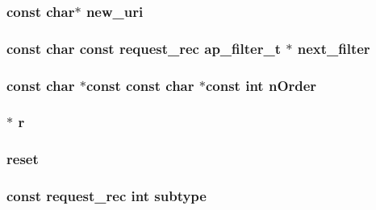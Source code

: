 \subsubsection[{\texorpdfstring{new\+\_\+uri}{new_uri}}]{\setlength{\rightskip}{0pt plus 5cm}const char$\ast$ new\+\_\+uri}\hypertarget{group__APACHE__CORE__REQ_ga65e3869c33c434213e1bc568332c0df9}{}\label{group__APACHE__CORE__REQ_ga65e3869c33c434213e1bc568332c0df9}
\subsubsection[{\texorpdfstring{next\+\_\+filter}{next_filter}}]{\setlength{\rightskip}{0pt plus 5cm}const char const {\bf request\+\_\+rec} {\bf ap\+\_\+filter\+\_\+t} $\ast$ next\+\_\+filter}\hypertarget{group__APACHE__CORE__REQ_ga9152b2a73566c0e87928a82d0e659c6c}{}\label{group__APACHE__CORE__REQ_ga9152b2a73566c0e87928a82d0e659c6c}
\subsubsection[{\texorpdfstring{n\+Order}{nOrder}}]{\setlength{\rightskip}{0pt plus 5cm}const char $\ast$const const char $\ast$const {\bf int} n\+Order}\hypertarget{group__APACHE__CORE__REQ_ga97a1daf1c1f7ee104df3d828c9d844db}{}\label{group__APACHE__CORE__REQ_ga97a1daf1c1f7ee104df3d828c9d844db}
\subsubsection[{\texorpdfstring{r}{r}}]{$\ast$ r}\hypertarget{group__APACHE__CORE__REQ_gac68e921ed15f71060d618adb662a84f6}{}\label{group__APACHE__CORE__REQ_gac68e921ed15f71060d618adb662a84f6}
\subsubsection[{\texorpdfstring{reset}{reset}}]{ reset}\hypertarget{group__APACHE__CORE__REQ_gadb7a760512715e86f925f8a8d4a15ba8}{}\label{group__APACHE__CORE__REQ_gadb7a760512715e86f925f8a8d4a15ba8}
\subsubsection[{\texorpdfstring{subtype}{subtype}}]{\setlength{\rightskip}{0pt plus 5cm}const {\bf request\+\_\+rec} {\bf int} subtype}\hypertarget{group__APACHE__CORE__REQ_ga97af40e4dc8153104d9082d37b6b2fa2}{}\label{group__APACHE__CORE__REQ_ga97af40e4dc8153104d9082d37b6b2fa2}
